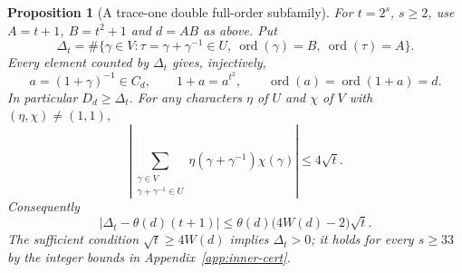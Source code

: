 \documentclass[11pt]{article}
\newtheorem{proposition}[theorem]{Proposition}
\begin{document}
\begin{proposition}[A trace-one double full-order subfamily]
\label{prop:inner-diagonal-double}
For $t=2^s$, $s\ge2$, use $A=t+1$, $B=t^2+1$ and $d=AB$ as above.
Put
\[
 \Delta_t=\#\{\gamma\in V:\tau=\gamma+\gamma^{-1}\in U,
                 \ \operatorname{ord}(\gamma)=B,
                 \ \operatorname{ord}(\tau)=A\}.
\]
Every element counted by $\Delta_t$ gives, injectively,
\begin{equation}\label{eq:inner-diagonal-construction}
 a=(1+\gamma)^{-1}\in C_d,\qquad
 1+a=a^{t^2},\qquad
 \operatorname{ord}(a)=\operatorname{ord}(1+a)=d.
\end{equation}
In particular $D_d\ge\Delta_t$. For any characters $\eta$ of $U$
and $\chi$ of $V$ with $(\eta,\chi)\ne(1,1)$,
\begin{equation}\label{eq:inner-diagonal-character}
 \left|\sum_{\substack{\gamma\in V\\
                       \gamma+\gamma^{-1}\in U}}
       \eta(\gamma+\gamma^{-1})\chi(\gamma)\right|\le4\sqrt t.
\end{equation}
Consequently
\begin{equation}\label{eq:inner-diagonal-count}
 |\Delta_t-\theta(d)(t+1)|
       \le\theta(d)\bigl(4W(d)-2\bigr)\sqrt t.
\end{equation}
The sufficient condition $\sqrt t\ge4W(d)$ implies $\Delta_t>0$;
it holds for every $s\ge33$ by the integer bounds in
Appendix~\ref{app:inner-cert}.
\end{proposition}
\end{document}
